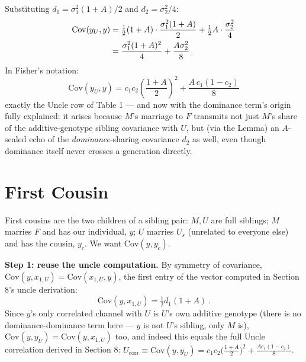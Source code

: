 \documentclass[12pt]{article}
\begin{document}
Substituting $d_1=\sigma_1^2(1+A)/2$ and $d_2=\sigma_2^2/4$:
\begin{align}
\mathrm{Cov}(y_U,y) &= \tfrac12(1+A)\cdot\frac{\sigma_1^2(1+A)}{2} + \tfrac12A\cdot\frac{\sigma_2^2}{4} \notag \\
&= \frac{\sigma_1^2(1+A)^2}{4} + \frac{A\sigma_2^2}{8} \, .
\end{align}
In Fisher's notation:
\begin{equation}
\boxed{\mathrm{Cov}(y_U,y) = c_1c_2\left(\frac{1+A}{2}\right)^2 + \frac{A\,c_1(1-c_2)}{8}}
\end{equation}
exactly the Uncle row of Table 1 — and now with the dominance term's origin fully explained: it arises because $M$'s marriage to $F$ transmits not just $M$'s share of the additive-genotype sibling covariance with $U$, but (via the Lemma) an $A$-scaled echo of the \emph{dominance}-sharing covariance $d_2$ as well, even though dominance itself never crosses a generation directly.

\section{First Cousin}

First cousins are the two children of a sibling pair: $M,U$ are full siblings; $M$ marries $F$ and has our individual, $y$; $U$ marries $U_s$ (unrelated to everyone else) and has the cousin, $y_c$. We want $\mathrm{Cov}(y,y_c)$.

\textbf{Step 1: reuse the uncle computation.} By symmetry of covariance, $\mathrm{Cov}(y,x_{1,U}) = \mathrm{Cov}(x_{1,U},y)$, the first entry of the vector computed in Section 8's uncle derivation:
\begin{equation}
\mathrm{Cov}(y,x_{1,U}) = \tfrac12d_1(1+A) \, . \tag{9.1}
\end{equation}
Since $y$'s only correlated channel with $U$ is $U$'s own additive genotype (there is no dominance-dominance term here — $y$ is not $U$'s sibling, only $M$ is), $\mathrm{Cov}(y,y_U)=\mathrm{Cov}(y,x_{1,U})$ too, and indeed this equals the full Uncle correlation derived in Section 8: $U_{\mathrm{corr}}\equiv\mathrm{Cov}(y,y_U)=c_1c_2\big(\tfrac{1+A}{2}\big)^2+\tfrac{Ac_1(1-c_2)}{8}$.
\end{document}

